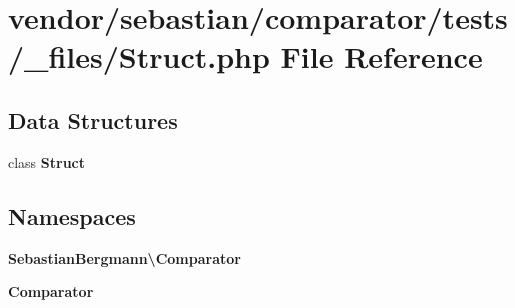 \section{vendor/sebastian/comparator/tests/\+\_\+files/\+Struct.php File Reference}
\label{sebastian_2comparator_2tests_2__files_2_struct_8php}
\subsection*{Data Structures}
\begin{DoxyCompactItemize}
\item 
class {\bf Struct}
\end{DoxyCompactItemize}
\subsection*{Namespaces}
\begin{DoxyCompactItemize}
\item 
 {\bf Sebastian\+Bergmann\textbackslash{}\+Comparator}
\item 
 {\bf Comparator}
\end{DoxyCompactItemize}
